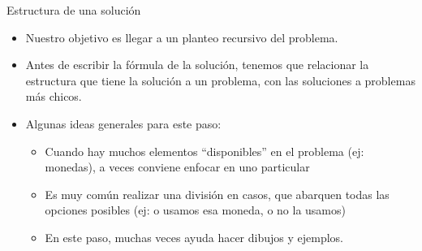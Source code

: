 \documentclass{beamer}
\begin{document}
\begin{frame}{Estructura de una solución}
    \begin{itemize}
        \item Nuestro objetivo es llegar a un planteo recursivo del problema.
        \item Antes de escribir la fórmula de la solución, tenemos que relacionar la estructura que tiene la solución a un problema, con las soluciones a problemas más chicos.
        \item Algunas ideas generales para este paso:
        \begin{itemize}
            \item Cuando hay muchos elementos ``disponibles'' en el problema (ej: monedas), a veces conviene enfocar en uno particular
            \item Es muy común realizar una división en casos, que abarquen todas las opciones posibles (ej: o usamos esa moneda, o no la usamos)
            \item En este paso, muchas veces ayuda hacer dibujos y ejemplos.
        \end{itemize}
    \end{itemize} 
\end{frame}
\end{document}
